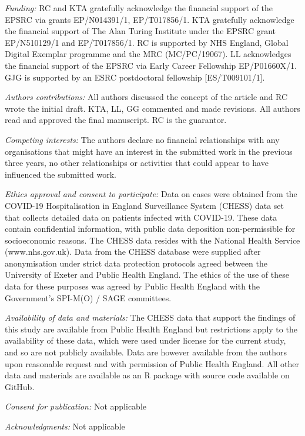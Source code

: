 \documentclass[
]{article}
\begin{document}
\emph{Funding:} RC and KTA gratefully acknowledge the financial support
of the EPSRC via grants EP/N014391/1, EP/T017856/1. KTA gratefully
acknowledge the financial support of The Alan Turing Institute under the
EPSRC grant EP/N510129/1 and EP/T017856/1. RC is supported by NHS
England, Global Digital Exemplar programme and the MRC (MC/PC/19067). LL
acknowledges the financial support of the EPSRC via Early Career
Fellowship EP/P01660X/1. GJG is supported by an ESRC postdoctoral
fellowship {[}ES/T009101/1{]}.

\emph{Authors contributions:} All authors discussed the concept of the
article and RC wrote the initial draft. KTA, LL, GG commented and made
revisions. All authors read and approved the final manuscript. RC is the
guarantor.

\emph{Competing interests:} The authors declare no financial
relationships with any organisations that might have an interest in the
submitted work in the previous three years, no other relationships or
activities that could appear to have influenced the submitted work.

\emph{Ethics approval and consent to participate:} Data on cases were
obtained from the COVID-19 Hospitalisation in England Surveillance
System (CHESS) data set that collects detailed data on patients infected
with COVID-19. These data contain confidential information, with public
data deposition non-permissible for socioeconomic reasons. The CHESS
data resides with the National Health Service (www.nhs.gov.uk). Data
from the CHESS database were supplied after anonymisation under strict
data protection protocols agreed between the University of Exeter and
Public Health England. The ethics of the use of these data for these
purposes was agreed by Public Health England with the Government's
SPI-M(O) / SAGE committees.

\emph{Availability of data and materials:} The CHESS data that support
the findings of this study are available from Public Health England but
restrictions apply to the availability of these data, which were used
under license for the current study, and so are not publicly available.
Data are however available from the authors upon reasonable request and
with permission of Public Health England. All other data and materials
are available as an R package with source code available on GitHub.

\emph{Consent for publication:} Not applicable

\emph{Acknowledgments:} Not applicable
\end{document}
